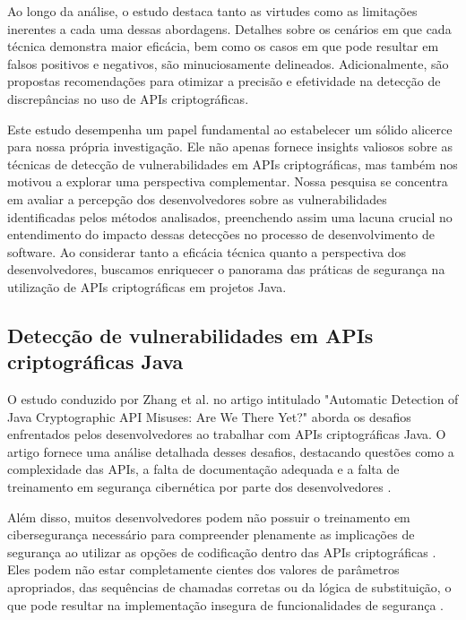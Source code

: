 Ao longo da análise, o estudo destaca tanto as virtudes como as limitações inerentes a cada uma dessas abordagens. Detalhes sobre os cenários em que cada técnica demonstra maior eficácia, bem como os casos em que pode resultar em falsos positivos e negativos, são minuciosamente delineados. Adicionalmente, são propostas recomendações para otimizar a precisão e efetividade na detecção de discrepâncias no uso de APIs criptográficas.

Este estudo desempenha um papel fundamental ao estabelecer um sólido alicerce para nossa própria investigação. Ele não apenas fornece insights valiosos sobre as técnicas de detecção de vulnerabilidades em APIs criptográficas, mas também nos motivou a explorar uma perspectiva complementar. Nossa pesquisa se concentra em avaliar a percepção dos desenvolvedores sobre as vulnerabilidades identificadas pelos métodos analisados, preenchendo assim uma lacuna crucial no entendimento do impacto dessas detecções no processo de desenvolvimento de software. Ao considerar tanto a eficácia técnica quanto a perspectiva dos desenvolvedores, buscamos enriquecer o panorama das práticas de segurança na utilização de APIs criptográficas em projetos Java.

\subsection{Detecção de vulnerabilidades em APIs criptográficas Java} %

O estudo conduzido por Zhang et al. no artigo intitulado "Automatic Detection of Java Cryptographic API Misuses: Are We There Yet?" \cite{api_misuses_zhang} aborda os desafios enfrentados pelos desenvolvedores ao trabalhar com APIs criptográficas Java. O artigo fornece uma análise detalhada desses desafios, destacando questões como a complexidade das APIs, a falta de documentação adequada e a falta de treinamento em segurança cibernética por parte dos desenvolvedores \cite{api_misuses_zhang}.

Além disso, muitos desenvolvedores podem não possuir o treinamento em cibersegurança necessário para compreender plenamente as implicações de segurança ao utilizar as opções de codificação dentro das APIs criptográficas \cite{api_misuses_zhang}. Eles podem não estar completamente cientes dos valores de parâmetros apropriados, das sequências de chamadas corretas ou da lógica de substituição, o que pode resultar na implementação insegura de funcionalidades de segurança \cite{api_misuses_zhang}.

